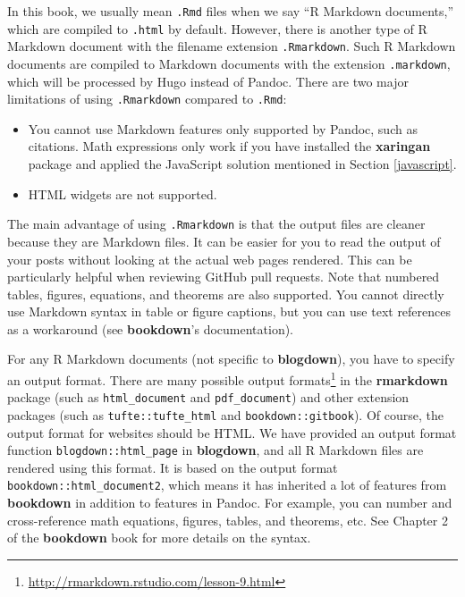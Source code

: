 \documentclass[12pt,]{krantz}
\renewcommand{\href}[2]{#2\footnote{\url{#1}}}
\theoremstyle{definition}
\theoremstyle{definition}
\theoremstyle{definition}
\theoremstyle{remark}
\begin{document}
In this book, we usually mean \texttt{.Rmd} files when we say ``R
Markdown documents,'' which are compiled to \texttt{.html} by default.
However, there is another type of R Markdown document with the filename
extension \texttt{.Rmarkdown}. Such R Markdown documents are compiled to
Markdown documents with the extension \texttt{.markdown}, which will be
processed by Hugo instead of Pandoc. There are two major limitations of
using \texttt{.Rmarkdown} compared to \texttt{.Rmd}:

\begin{itemize}
\item
  You cannot use Markdown features only supported by Pandoc, such as
  citations. Math expressions only work if you have installed the
  \textbf{xaringan} package \citep{R-xaringan} and applied the
  JavaScript solution mentioned in Section \ref{javascript}.
\item
  HTML widgets are not supported.
\end{itemize}

The main advantage of using \texttt{.Rmarkdown} is that the output files
are cleaner because they are Markdown files. It can be easier for you to
read the output of your posts without looking at the actual web pages
rendered. This can be particularly helpful when reviewing GitHub pull
requests. Note that numbered tables, figures, equations, and theorems
are also supported. You cannot directly use Markdown syntax in table or
figure captions, but you can use text references as a workaround (see
\textbf{bookdown}'s documentation).

For any R Markdown documents (not specific to \textbf{blogdown}), you
have to specify an output format. There are many
\href{http://rmarkdown.rstudio.com/lesson-9.html}{possible output
formats} in the \textbf{rmarkdown} package (such as
\texttt{html\_document} and \texttt{pdf\_document}) and other extension
packages (such as \texttt{tufte::tufte\_html} and
\texttt{bookdown::gitbook}). Of course, the output format for websites
should be HTML. We have provided an output format function
\texttt{blogdown::html\_page} in \textbf{blogdown}, and all R Markdown
files are rendered using this format. It is based on the output format
\texttt{bookdown::html\_document2}, which means it has inherited a lot
of features from \textbf{bookdown} in addition to features in Pandoc.
For example, you can number and cross-reference math equations, figures,
tables, and theorems, etc. See Chapter 2 of the \textbf{bookdown} book
\citep{xie2016} for more details on the syntax.
\end{document}
